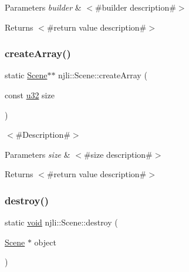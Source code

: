 \begin{DoxyParams}{Parameters}
{\em builder} & $<$\#builder description\#$>$\\
\hline
\end{DoxyParams}
\begin{DoxyReturn}{Returns}
$<$\#return value description\#$>$ 
\end{DoxyReturn}
\mbox{\label{classnjli_1_1_scene_a941f75f0519b1ffa1a9bc02cabb33d1d}} 
\subsubsection{\texorpdfstring{create\+Array()}{createArray()}}
{\footnotesize\ttfamily static \mbox{\hyperlink{classnjli_1_1_scene}{Scene}}$\ast$$\ast$ njli\+::\+Scene\+::create\+Array (\begin{DoxyParamCaption}\item[{const \mbox{\hyperlink{_util_8h_a10e94b422ef0c20dcdec20d31a1f5049}{u32}}}]{size }\end{DoxyParamCaption})\hspace{0.3cm}{\ttfamily [static]}}

$<$\#\+Description\#$>$


\begin{DoxyParams}{Parameters}
{\em size} & $<$\#size description\#$>$\\
\hline
\end{DoxyParams}
\begin{DoxyReturn}{Returns}
$<$\#return value description\#$>$ 
\end{DoxyReturn}
\mbox{\label{classnjli_1_1_scene_ab37540b9164d318889e1323be7fa3b8b}} 
\subsubsection{\texorpdfstring{destroy()}{destroy()}}
{\footnotesize\ttfamily static \mbox{\hyperlink{_thread_8h_af1e856da2e658414cb2456cb6f7ebc66}{void}} njli\+::\+Scene\+::destroy (\begin{DoxyParamCaption}\item[{\mbox{\hyperlink{classnjli_1_1_scene}{Scene}} $\ast$}]{object }\end{DoxyParamCaption})\hspace{0.3cm}{\ttfamily [static]}}

